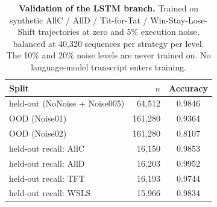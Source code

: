\documentclass[11pt,a4paper]{article}
\begin{document}
\begin{table}[htbp]
\centering
\footnotesize
\setlength{\tabcolsep}{4pt}
\caption{\textbf{Validation of the LSTM branch.} Trained on synthetic AllC / AllD / Tit-for-Tat / Win-Stay-Lose-Shift trajectories at zero and 5\% execution noise, balanced at 40{,}320 sequences per strategy per level. The 10\% and 20\% noise levels are never trained on. No language-model transcript enters training.}
\label{tab:S-classifier}
\begin{tabular}{@{}lrc@{}}
\toprule
Split & $n$ & Accuracy \\
\midrule
held-out (NoNoise + Noise005) & 64,512 & 0.9846 \\
OOD (Noise01) & 161,280 & 0.9364 \\
OOD (Noise02) & 161,280 & 0.8107 \\
held-out recall: AllC & 16,150 & 0.9853 \\
held-out recall: AllD & 16,203 & 0.9952 \\
held-out recall: TFT & 16,193 & 0.9744 \\
held-out recall: WSLS & 15,966 & 0.9834 \\
\bottomrule
\end{tabular}
\end{table}

\begin{table}[htbp]
\centering
\footnotesize
\setlength{\tabcolsep}{4pt}
\caption{\textbf{Pairwise correlation between the model curves, five models.} Correlation of the ten-point cooperation-against-scale curves of each pair of the five models the main text reports. Six of the ten pairs are negative and the mean is $-0.10$, which is why averaging the curves cancels much of the movement.}
\label{tab:S-shapes}
\end{table}
\end{document}
